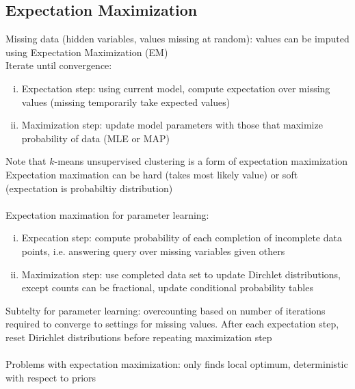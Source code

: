 \documentclass{article}
\begin{document}
		\subsection{Expectation Maximization}
			Missing data (hidden variables, values missing at random): values can be imputed using Expectation Maximization (EM) \\
			Iterate until convergence:
			\begin{enumerate}[(i)]
				\item Expectation step: using current model, compute expectation over missing values (missing temporarily take expected values)
				\item Maximization step: update model parameters with those that maximize probability of data (MLE or MAP)
				\end{enumerate}
			Note that $k$-means unsupervised clustering is a form of expectation maximization \\
			Expectation maximation can be hard (takes most likely value) or soft (expectation is probabiltiy distribution) \\
			\\
			Expectation maximation for parameter learning:
			\begin{enumerate}[(i)]
				\item Expecation step: compute probability of each completion of incomplete data points, i.e. answering query over missing variables given others
				\item Maximization step: use completed data set to update Dirchlet distributions, except counts can be fractional, update conditional probability tables
				\end{enumerate}
			Subtelty for parameter learning: overcounting based on number of iterations required to converge to settings for missing values. After each expectation step, reset Dirichlet distributions before repeating maximization step \\
			\\
			Problems with expectation maximization: only finds local optimum, deterministic with respect to priors
\end{document}

